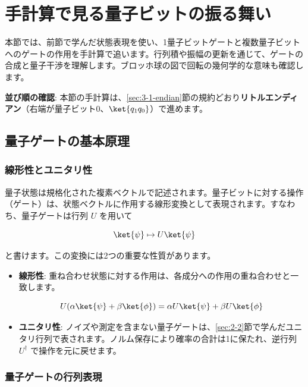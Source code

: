 \section{手計算で見る量子ビットの振る舞い}\label{sec:3-2}

\begin{sectiongoal}
本節では、前節で学んだ状態表現を使い、1量子ビットゲートと複数量子ビットへのゲートの作用を手計算で追います。行列積や振幅の更新を通じて、ゲートの合成と量子干渉を理解します。ブロッホ球の図で回転の幾何学的な意味も確認します。
\end{sectiongoal}

\begin{notebox}
\textbf{並び順の確認}: 本節の手計算は、\ref{sec:3-1-endian}節の規約どおり\textbf{リトルエンディアン}（右端が量子ビット0、$\ket{q_1 q_0}$）で進めます。
\end{notebox}

\subsection{量子ゲートの基本原理}

\subsubsection{線形性とユニタリ性}

量子状態は規格化された複素ベクトルで記述されます。量子ビットに対する操作（ゲート）は、状態ベクトルに作用する線形変換として表現されます。すなわち、量子ゲートは行列 $U$ を用いて

\[
\ket{\psi} \mapsto U \ket{\psi}
\]

と書けます。この変換には2つの重要な性質があります。

\begin{itemize}
\item \textbf{線形性}: 重ね合わせ状態に対する作用は、各成分への作用の重ね合わせと一致します。

\[
U (\alpha \ket{\psi} + \beta \ket{\phi}) = \alpha U \ket{\psi} + \beta U \ket{\phi}
\]

\item \textbf{ユニタリ性}: ノイズや測定を含まない量子ゲートは、\ref{sec:2-2}節で学んだユニタリ行列で表されます。ノルム保存により確率の合計は1に保たれ、逆行列 $U^\dagger$ で操作を元に戻せます。
\end{itemize}

\subsubsection{量子ゲートの行列表現}

